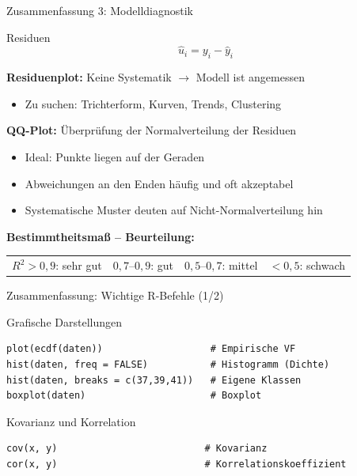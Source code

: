 \documentclass[aspectratio=169,11pt]{beamer}
\begin{document}
\begin{frame}{Zusammenfassung 3: Modelldiagnostik}
  \begin{block}{Residuen}
    \vspace{-0.3cm}
    \[ \hat{u}_i = y_i - \hat{y}_i \]
  \end{block}

  \vspace{0.2cm}

  \textbf{Residuenplot:} Keine Systematik $\to$ Modell ist angemessen
  \begin{itemize}
    \item Zu suchen: Trichterform, Kurven, Trends, Clustering
  \end{itemize}

  \vspace{0.3cm}

  \textbf{QQ-Plot:} Überprüfung der Normalverteilung der Residuen
  \begin{itemize}
    \item Ideal: Punkte liegen auf der Geraden
    \item Abweichungen an den Enden häufig und oft akzeptabel
    \item Systematische Muster deuten auf Nicht-Normalverteilung hin
  \end{itemize}

  \vspace{0.3cm}

  \textbf{Bestimmtheitsmaß -- Beurteilung:}
  \begin{center}
    \begin{tabular}{cccc}
      $R^2 > 0{,}9$: sehr gut & $0{,}7$--$0{,}9$: gut & $0{,}5$--$0{,}7$: mittel & $< 0{,}5$: schwach
    \end{tabular}
  \end{center}
\end{frame}

\begin{frame}[fragile]{Zusammenfassung: Wichtige R-Befehle (1/2)}
  \begin{block}{Grafische Darstellungen}
    \begin{lstlisting}
plot(ecdf(daten))                   # Empirische VF
hist(daten, freq = FALSE)           # Histogramm (Dichte)
hist(daten, breaks = c(37,39,41))   # Eigene Klassen
boxplot(daten)                      # Boxplot
\end{lstlisting}
  \end{block}

  \vspace{0.3cm}

  \begin{block}{Kovarianz und Korrelation}
    \begin{lstlisting}
cov(x, y)                          # Kovarianz
cor(x, y)                          # Korrelationskoeffizient
\end{lstlisting}
  \end{block}
\end{frame}
\end{document}
